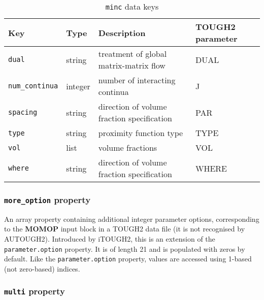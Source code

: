 \begin{table}
  \begin{center}
    \begin{tabular}{|l|l|l|l|}
      \hline
      \textbf{Key} & \textbf{Type} & \textbf{Description} & \textbf{TOUGH2 parameter}\\
      \hline
      \texttt{dual} & string & treatment of global matrix-matrix flow & DUAL\\
      \texttt{num\_continua} & integer & number of interacting continua & J\\
      \texttt{spacing} & string & direction of volume fraction specification & PAR\\
      \texttt{type} & string & proximity function type & TYPE\\
      \texttt{vol} & list & volume fractions & VOL\\
      \texttt{where} & string & direction of volume fraction specification & WHERE\\
      \hline
    \end{tabular}
    \caption{\texttt{minc} data keys}
    \label{tb:minc}
  \end{center}
\end{table}

\begin{snugshade}
\subsubsection{\texttt{more\_option} property}
\end{snugshade}
\label{sec:t2data:more_options}

An array property containing additional integer parameter options, corresponding to the \textbf{MOMOP} input block in a TOUGH2 data file (it is not recognised by AUTOUGH2). Introduced by iTOUGH2, this is an extension of the \texttt{parameter.option} property. It is of length 21 and is populated with zeros by default. Like the \texttt{parameter.option} property, values are accessed using 1-based (not zero-based) indices.

\begin{snugshade}
\subsubsection{\texttt{multi} property}
\end{snugshade}
\label{sec:t2data:multi}

